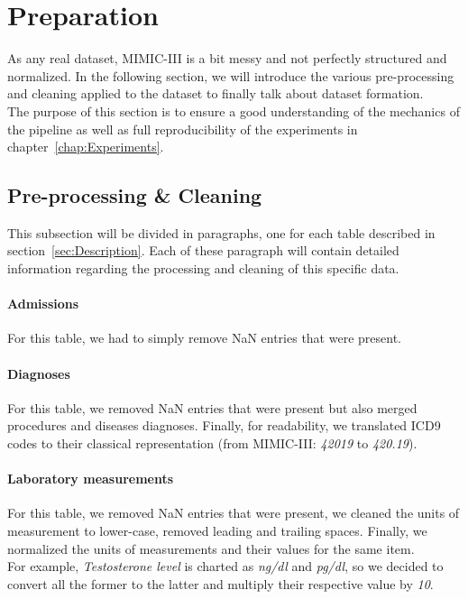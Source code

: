 \newpage
\section{Preparation}
\label{sec:Preparation}
As any real dataset, MIMIC-III is a bit messy and not perfectly structured and normalized. In the following section, we will introduce the various pre-processing and cleaning applied to the dataset to finally talk about dataset formation. \\

The purpose of this section is to ensure a good understanding of the mechanics of the pipeline as well as full reproducibility of the experiments in chapter~\ref{chap:Experiments}.

\subsection{Pre-processing \& Cleaning}
This subsection will be divided in paragraphs, one for each table described in section~\ref{sec:Description}. Each of these paragraph will contain detailed information regarding the processing and cleaning of this specific data.

\paragraph{Admissions} For this table, we had to simply remove NaN entries that were present.

\paragraph{Diagnoses} For this table, we removed NaN entries that were present but also merged procedures and diseases diagnoses. Finally, for readability, we translated ICD9 codes to their classical representation (from MIMIC-III: \textit{42019} to \textit{420.19}).

\paragraph{Laboratory measurements} For this table, we removed NaN entries that were present, we cleaned the units of measurement to lower-case, removed leading and trailing spaces. Finally, we normalized the units of measurements and their values for the same item.\\

For example, \textit{Testosterone level} is charted as \textit{ng/dl} and \textit{pg/dl}, so we decided to convert all the former to the latter and multiply their respective value by \textit{10}.

